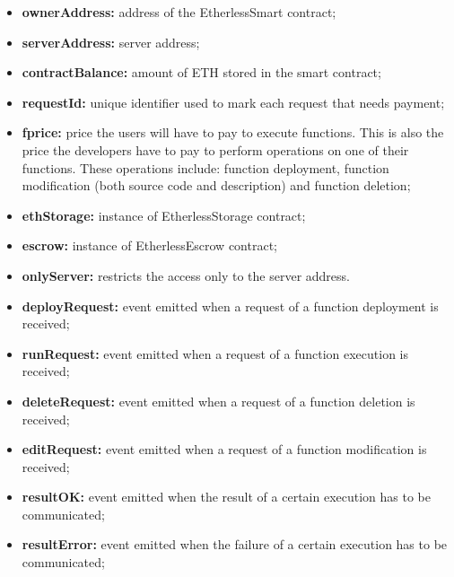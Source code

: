 	\begin{itemize}
		\item \textbf{ownerAddress:} address of the EtherlessSmart contract;
		\item \textbf{serverAddress:} server address;
		\item \textbf{contractBalance:} amount of ETH stored in the smart contract;
		\item \textbf{requestId:} unique identifier used to mark each request that needs payment;
		\item \textbf{fprice:} price the users will have to pay to execute functions. This is also the price the developers have to pay to perform operations on one of their functions. These operations include: function deployment, function modification (both source code and description) and function deletion;
		\item \textbf{ethStorage:} instance of EtherlessStorage contract;
		\item \textbf{escrow:} instance of EtherlessEscrow contract;
	\end{itemize}
	\begin{itemize}
		\item \textbf{onlyServer:} restricts the access only to the server address.
	\end{itemize}
	\begin{itemize}
		\item \textbf{deployRequest:} event emitted when a request of a function deployment is received;
		\item \textbf{runRequest:} event emitted when a request of a function execution is received;
		\item \textbf{deleteRequest:} event emitted when a request of a function deletion is received;
		\item \textbf{editRequest:} event emitted when a request of a function modification is received;
		\item \textbf{resultOK:} event emitted when the result of a certain execution has to be communicated;
		\item \textbf{resultError:} event emitted when the failure of a certain execution has to be communicated;
	\end{itemize}
